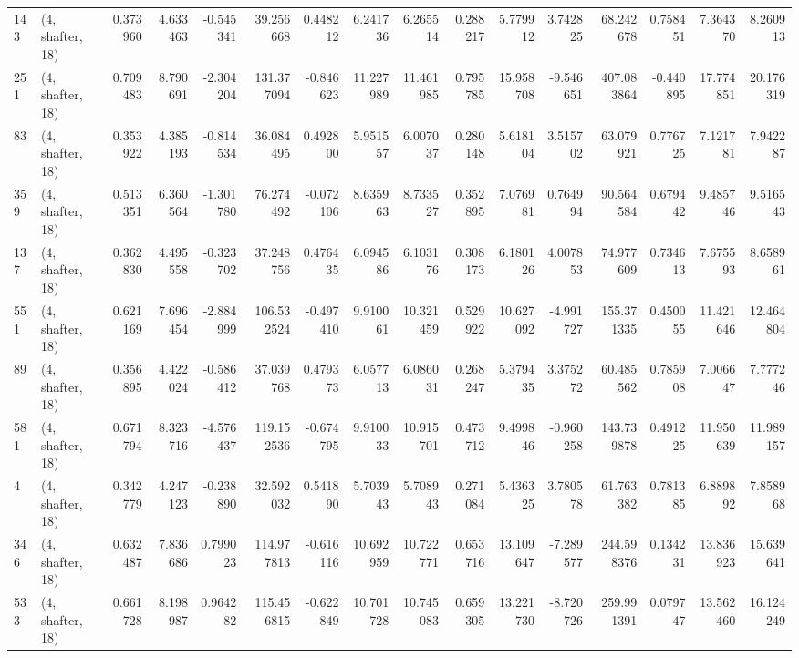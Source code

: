 \begin{tabular}{llrrrrrrrrrrrrrr}
143 &  (4, shafter, 18) &   0.373960 &   4.633463 &  -0.545341 &    39.256668 &   0.448212 &   6.241736 &   6.265514 &  0.288217 &   5.779912 &   3.742825 &    68.242678 &  0.758451 &   7.364370 &   8.260913 \\
251 &  (4, shafter, 18) &   0.709483 &   8.790691 &  -2.304204 &   131.377094 &  -0.846623 &  11.227989 &  11.461985 &  0.795785 &  15.958708 &  -9.546651 &   407.083864 & -0.440895 &  17.774851 &  20.176319 \\
83  &  (4, shafter, 18) &   0.353922 &   4.385193 &  -0.814534 &    36.084495 &   0.492800 &   5.951557 &   6.007037 &  0.280148 &   5.618104 &   3.515702 &    63.079921 &  0.776725 &   7.121781 &   7.942287 \\
359 &  (4, shafter, 18) &   0.513351 &   6.360564 &  -1.301780 &    76.274492 &  -0.072106 &   8.635963 &   8.733527 &  0.352895 &   7.076981 &   0.764994 &    90.564584 &  0.679442 &   9.485746 &   9.516543 \\
137 &  (4, shafter, 18) &   0.362830 &   4.495558 &  -0.323702 &    37.248756 &   0.476435 &   6.094586 &   6.103176 &  0.308173 &   6.180126 &   4.007853 &    74.977609 &  0.734613 &   7.675593 &   8.658961 \\
551 &  (4, shafter, 18) &   0.621169 &   7.696454 &  -2.884999 &   106.532524 &  -0.497410 &   9.910061 &  10.321459 &  0.529922 &  10.627092 &  -4.991727 &   155.371335 &  0.450055 &  11.421646 &  12.464804 \\
89  &  (4, shafter, 18) &   0.356895 &   4.422024 &  -0.586412 &    37.039768 &   0.479373 &   6.057713 &   6.086031 &  0.268247 &   5.379435 &   3.375272 &    60.485562 &  0.785908 &   7.006647 &   7.777246 \\
581 &  (4, shafter, 18) &   0.671794 &   8.323716 &  -4.576437 &   119.152536 &  -0.674795 &   9.910033 &  10.915701 &  0.473712 &   9.499846 &  -0.960258 &   143.739878 &  0.491225 &  11.950639 &  11.989157 \\
4   &  (4, shafter, 18) &   0.342779 &   4.247123 &  -0.238890 &    32.592032 &   0.541890 &   5.703943 &   5.708943 &  0.271084 &   5.436325 &   3.780578 &    61.763382 &  0.781385 &   6.889892 &   7.858968 \\
346 &  (4, shafter, 18) &   0.632487 &   7.836686 &   0.799023 &   114.977813 &  -0.616116 &  10.692959 &  10.722771 &  0.653716 &  13.109647 &  -7.289577 &   244.598376 &  0.134231 &  13.836923 &  15.639641 \\
533 &  (4, shafter, 18) &   0.661728 &   8.198987 &   0.964282 &   115.456815 &  -0.622849 &  10.701728 &  10.745083 &  0.659305 &  13.221730 &  -8.720726 &   259.991391 &  0.079747 &  13.562460 &  16.124249 \\

\end{tabular}
